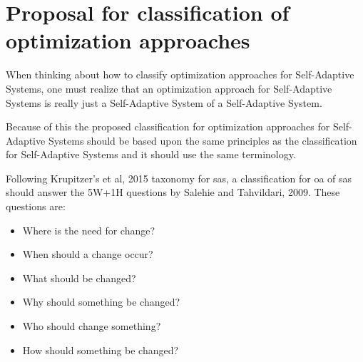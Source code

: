 \newpage
\section{Proposal for classification of optimization approaches}
\label{ch:Proposal}




When thinking about how to classify optimization approaches for Self-Adaptive Systems,
one must realize that an optimization approach for Self-Adaptive Systems is really just
a Self-Adaptive System of a Self-Adaptive System.

Because of this the proposed classification for optimization approaches for Self-Adaptive Systems
should be based upon the same principles as the classification for Self-Adaptive Systems
and it should use the same terminology.

Following Krupitzer's et al, 2015\cite*{SurveyOnEngineeringApproaches} taxonomy for \acrlong{sas},
a classification for \acrlong{oa} of \acrshort{sas} should answer 
the 5W+1H questions by Salehie and Tahvildari, 2009\cite*{LandscapeAndResearchChallenges}.
These questions are:
\begin{itemize}
    \item Where is the need for change?
    \item When should a change occur?
    \item What should be changed?
    \item Why should something be changed?
    \item Who should change something?
    \item How should something be changed?
\end{itemize}

